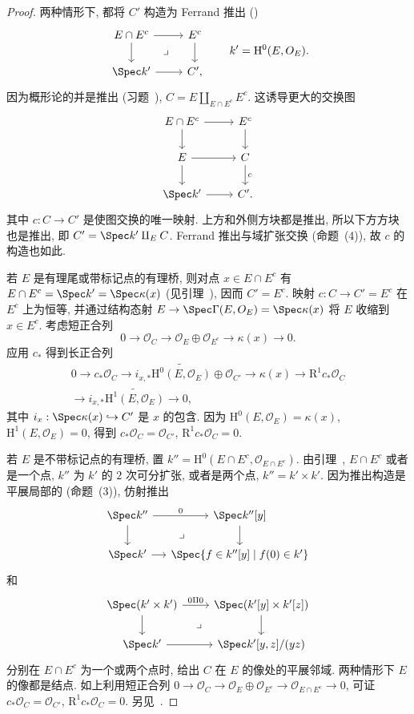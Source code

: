 \begin{proof}
两种情形下, 都将 $C'$ 构造为 Ferrand 推出 ()
\[
\begin{tikzcd}
E\cap E^c\arrow[r]\arrow[d]&E^c\arrow[d]\\
\Spec k'\arrow[r]\arrow[ur,phantom,"\lrcorner"]&C',
\end{tikzcd}
\qquad k'=\mathrm H^0(E,\mathcal O_E).
\]
因为概形论的并是推出 (习题~), $C=E\amalg_{E\cap E^c}E^c$. 这诱导更大的交换图
\[
\begin{tikzcd}
E\cap E^c\arrow[r]\arrow[d]&E^c\arrow[d]\\
E\arrow[r]\arrow[d]&C\arrow[d,"c"]\\
\Spec k'\arrow[r]&C'.
\end{tikzcd}
\]
其中 $c:C\to\allowbreak C'$ 是使图交换的唯一映射. 上方和外侧方块都是推出, 所以下方方块也是推出, 即 $C'=\Spec k'\amalg_E C$. Ferrand 推出与域扩张交换 (命题~(4)), 故 $c$ 的构造也如此.

若 $E$ 是有理尾或带标记点的有理桥, 则对点 $x\in E\cap E^c$ 有 $E\cap E^c=\Spec k'=\Spec\kappa(x)$ (见引理~), 因而 $C'=E^c$. 映射 $c:C\to\allowbreak C'=E^c$ 在 $E^c$ 上为恒等, 并通过结构态射 $E\to\Spec\Gamma(E,\allowbreak \mathcal O_E)=\Spec\kappa(x)$ 将 $E$ 收缩到 $x\in E^c$. 考虑短正合列
\[
0\to\mathcal O_C\to\mathcal O_E\oplus\mathcal O_{E^c}\to\kappa(x)\to0.
\]
应用 $c_*$ 得到长正合列
\[
\begin{aligned}
0\to c_*\mathcal O_C\to i_{x,*}\widetilde{\mathrm H^0(E,\mathcal O_E)}\oplus\mathcal O_{C'}
\to\kappa(x)\to\mathrm R^1c_*\mathcal O_C\\
\to i_{x,*}\widetilde{\mathrm H^1(E,\mathcal O_E)}\to0,
\end{aligned}
\]
其中 $i_x:\Spec\kappa(x)\hookrightarrow C'$ 是 $x$ 的包含. 因为 $\mathrm H^0(E,\allowbreak \mathcal O_E)=\kappa(x)$, $\mathrm H^1(E,\allowbreak \mathcal O_E)=0$, 得到 $c_*\mathcal O_C=\mathcal O_{C'}$, $\mathrm R^1c_*\mathcal O_C=0$.

若 $E$ 是不带标记点的有理桥, 置 $k''=\mathrm H^0(E\cap E^c,\allowbreak \mathcal O_{E\cap E^c})$. 由引理~, $E\cap E^c$ 或者是一个点, $k''$ 为 $k'$ 的 $2$ 次可分扩张, 或者是两个点, $k''=k'\times k'$. 因为推出构造是平展局部的 (命题~(3)), 仿射推出
\[
\begin{tikzcd}[column sep=small]
\Spec k''\arrow[r,"0"]\arrow[d]&\Spec k''[y]\arrow[d]\\
\Spec k'\arrow[r]\arrow[ur,phantom,"\lrcorner"]&\Spec\{f\in k''[y]\mid f(0)\in k'\}
\end{tikzcd}
\]
和
\[
\begin{tikzcd}
\Spec(k'\times k')\arrow[r,"0\amalg0"]\arrow[d]&\Spec(k'[y]\times k'[z])\arrow[d]\\
\Spec k'\arrow[r]\arrow[ur,phantom,"\lrcorner"]&\Spec k'[y,z]/(yz)
\end{tikzcd}
\]
分别在 $E\cap E^c$ 为一个或两个点时, 给出 $C$ 在 $E$ 的像处的平展邻域. 两种情形下 $E$ 的像都是结点. 如上利用短正合列 $0\to\mathcal O_C\to\mathcal O_E\oplus\mathcal O_{E^c}\to\mathcal O_{E\cap E^c}\to0$, 可证 $c_*\mathcal O_C=\mathcal O_{C'}$, $\mathrm R^1c_*\mathcal O_C=0$. 另见~\cite[Tags 0E3H, 0E3M]{SP}.
\end{proof}
